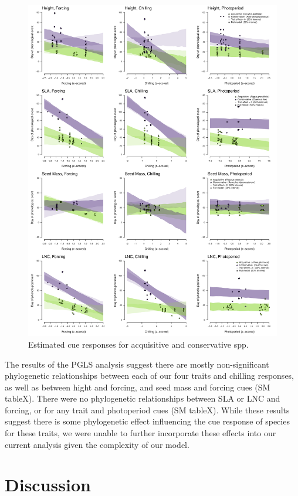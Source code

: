 \documentclass{article}\usepackage[]{graphicx}\usepackage[]{color}
\begin{document}
\begin{figure}[h!]
    \centering
 \includegraphics[width=\textwidth]{..//..//analyses/traits/figures/slopesConsAcqu.pdf} 
    \caption{Estimated cue responses for acquisitive and conservative spp.}
    \label{fig:slopes}
\end{figure}

The results of the PGLS analysis suggest there are mostly non-significant phylogenetic relationships between each of our four traits and chilling responses, as well as between hight and forcing, and seed mass and forcing cues (SM tableX). There were no phylogenetic relationships between SLA or LNC and forcing, or for any trait and photoperiod cues (SM tableX). While these results suggest there is some phylogenetic effect influencing the cue response of species for these traits, we were unable to further incorporate these effects into our current analysis given the complexity of our model. 

\section{Discussion}
\end{document}

